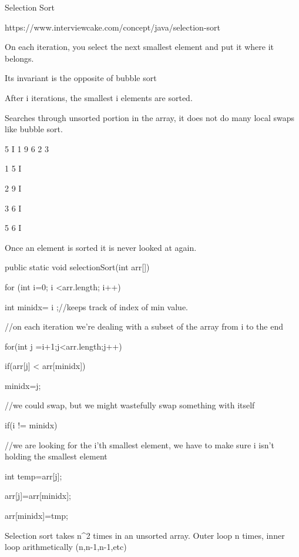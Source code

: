  

Selection Sort 

https://www.interviewcake.com/concept/java/selection-sort  

On each iteration, you select the next smallest element and put it where it belongs. 

Its invariant is the opposite of bubble sort 

After i iterations, the smallest i elements are sorted. 

Searches through unsorted portion in the array, it does not do many local swaps like bubble sort. 

5 I   1 9 6 2 3  

1 5 I   

      2 9  I 

           3 6 I 

                  5 6 I 

Once an element is sorted it is never looked at again. 

public static void selectionSort(int arr[]){ 

for (int i=0; i <arr.length; i++){ 

int minidx= i ;//keeps track of index of min value. 

//on each iteration we're dealing with a subset of the array from i to the end 

for(int j =i+1;j<arr.length;j++){ 

if(arr[j] < arr[minidx]){ 

minidx=j; 

} 

} 

//we could swap, but we might wastefully swap something with itself 

if(i != minidx){ 

//we are looking for the i'th smallest element, we have to make sure i isn't holding the smallest element 

int temp=arr[j]; 

arr[j]=arr[minidx]; 

arr[minidx]=tmp; 

} 

 

} 

 

} 

 

Selection sort takes n^2 times in an unsorted array. Outer loop n times, inner loop arithmetically (n,n-1,n-1,etc) 

